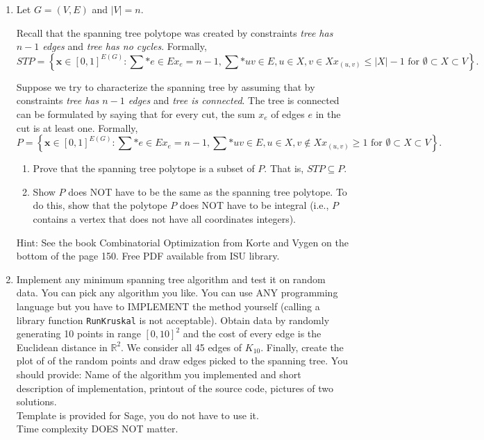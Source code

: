 \documentclass[11pt, oneside]{article}
\begin{document}
\begin{enumerate}
  \item %
    Let $G=(V,E)$ and $|V|=n$.

    Recall that the spanning tree polytope was created by constraints \emph{tree has $n-1$ edges}
    and \emph{tree has no cycles}. Formally,
    \[
      STP = 
      \left\{
        \textbf{x} \in [0,1]^{E(G)}: \sum*{e \in E}{}{x_e} = n-1, \sum*{uv \in E, u\in X, v \in X}{}{x_{(u,v)}} \leq |X|-1 \text{ for } \emptyset \subset X \subset V
      \right\}.
    \]


    Suppose we try to characterize the spanning tree by assuming that by 
    constraints \emph{tree has $n-1$ edges} and \emph{tree is connected}.
    The tree is connected can be formulated by saying that for every cut, the sum $x_e$ of edges $e$ in the cut is at least one. Formally,
    \[
      P = 
      \left\{
        \textbf{x} \in [0,1]^{E(G)}: \sum*{e \in E}{}{x_e} = n-1, \sum*{uv \in E, u\in X, v \not\in X}{}{x_{(u,v)}} \geq 1 \text{ for } \emptyset \subset X \subset V
      \right\}.
    \]
    \begin{enumerate}
      \item Prove that the spanning tree polytope is a subset of $P$. That is, $STP \subseteq P$.
      \item Show $P$ does NOT have to be the same as the spanning tree polytope. To do this, show that
        the polytope $P$ does NOT have to be integral (i.e., $P$ contains a vertex that does not have all coordinates integers).
    \end{enumerate}
    Hint: See the book Combinatorial Optimization from Korte and Vygen on the bottom of the page 150. Free PDF available from ISU library.

  \item %
    Implement any minimum spanning tree algorithm and test it on random data.
    You can pick any algorithm you like. You can use ANY programming language but you have to IMPLEMENT the method yourself (calling a library function \texttt{RunKruskal} is not acceptable).
    Obtain data by randomly generating 10 points in range $[0,10]^2$ and the cost of every edge is the Euclidean distance in $\mathbb{R}^2$.
    We consider all 45 edges of $K_{10}$.
    Finally, create the plot of of the random points and draw edges picked to the spanning tree. You should provide: Name of the algorithm you implemented and short description of implementation, printout of the source code, pictures of two solutions.\\
    Template is provided for Sage, you do not have to use it.\\
    Time complexity DOES NOT matter. 
\end{enumerate}
\end{document}
